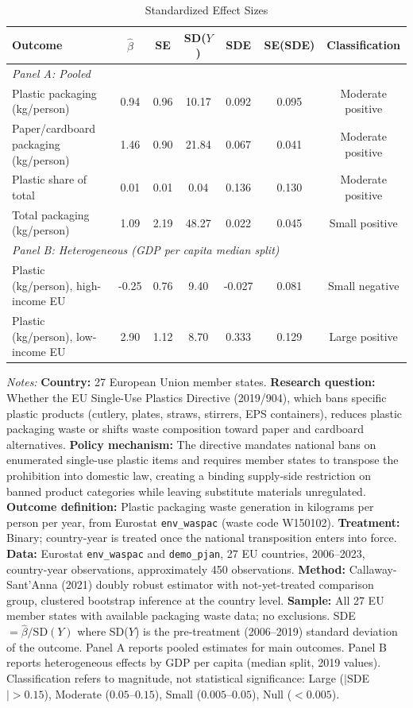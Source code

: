 \begin{table}[t]
\centering
\caption{Standardized Effect Sizes}
\label{tab:sde}
\begin{tabular}{lcccccc}
\toprule
  Outcome & $\hat{\beta}$ & SE & SD($Y$) & SDE & SE(SDE) & Classification \\
\midrule
\multicolumn{7}{l}{\textit{Panel A: Pooled}} \\[3pt]
  Plastic packaging (kg/person) & 0.94 & 0.96 & 10.17 & 0.092 & 0.095 & Moderate positive \\
  Paper/cardboard packaging (kg/person) & 1.46 & 0.90 & 21.84 & 0.067 & 0.041 & Moderate positive \\
  Plastic share of total & 0.01 & 0.01 & 0.04 & 0.136 & 0.130 & Moderate positive \\
  Total packaging (kg/person) & 1.09 & 2.19 & 48.27 & 0.022 & 0.045 & Small positive \\
\midrule
\multicolumn{7}{l}{\textit{Panel B: Heterogeneous (GDP per capita median split)}} \\[3pt]
  Plastic (kg/person), high-income EU & -0.25 & 0.76 & 9.40 & -0.027 & 0.081 & Small negative \\
  Plastic (kg/person), low-income EU & 2.90 & 1.12 & 8.70 & 0.333 & 0.129 & Large positive \\
\bottomrule
\end{tabular}
\begin{tablenotes}[flushleft]
\small
\item \textit{Notes:} \textbf{Country:} 27 European Union member states. \textbf{Research question:} Whether the EU Single-Use Plastics Directive (2019/904), which bans specific plastic products (cutlery, plates, straws, stirrers, EPS containers), reduces plastic packaging waste or shifts waste composition toward paper and cardboard alternatives. \textbf{Policy mechanism:} The directive mandates national bans on enumerated single-use plastic items and requires member states to transpose the prohibition into domestic law, creating a binding supply-side restriction on banned product categories while leaving substitute materials unregulated. \textbf{Outcome definition:} Plastic packaging waste generation in kilograms per person per year, from Eurostat \texttt{env\_waspac} (waste code W150102). \textbf{Treatment:} Binary; country-year is treated once the national transposition enters into force. \textbf{Data:} Eurostat \texttt{env\_waspac} and \texttt{demo\_pjan}, 27 EU countries, 2006--2023, country-year observations, approximately 450 observations. \textbf{Method:} Callaway-Sant'Anna (2021) doubly robust estimator with not-yet-treated comparison group, clustered bootstrap inference at the country level. \textbf{Sample:} All 27 EU member states with available packaging waste data; no exclusions. SDE $= \hat{\beta} / \text{SD}(Y)$ where SD($Y$) is the pre-treatment (2006--2019) standard deviation of the outcome. Panel A reports pooled estimates for main outcomes. Panel B reports heterogeneous effects by GDP per capita (median split, 2019 values). Classification refers to magnitude, not statistical significance: Large ($|$SDE$| > 0.15$), Moderate ($0.05$--$0.15$), Small ($0.005$--$0.05$), Null ($< 0.005$).
\end{tablenotes}
\end{table}

